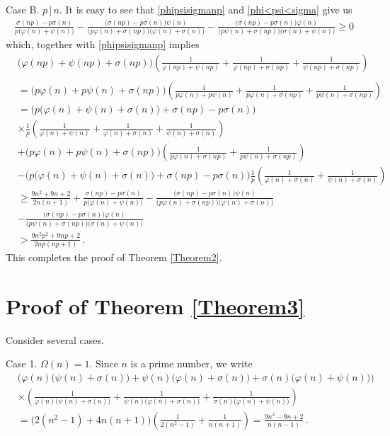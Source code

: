 \documentclass[12pt]{article}
\begin{document}
Case B.  \;  $p\,|\,n$. It is easy to see that \eqref{phipsisigmanp} and \eqref{phi<psi<sigma} give us
\begin{align*}
\frac{\sigma(np)-p\sigma(n)}{p\big(\varphi(n)+\psi(n)\big)}-\frac{\big(\sigma(np)-p\sigma(n))\psi(n)}{\big(p\varphi(n)+\sigma(np)\big)\big(\varphi(n)+\sigma(n)\big)}
-\frac{\big(\sigma(np)-p\sigma(n))\varphi(n)}{\big(p\psi(n)+\sigma(np)\big)\big(\sigma(n)+\psi(n)\big)}\geq0
\end{align*}
which, together with \eqref{phipsisigmanp} implies
\begin{align*}
&\big(\varphi(np)+\psi(np)+\sigma(np)\big)\left(\frac{1}{\varphi(np)+\psi(np)}+\frac{1}{\varphi(np)+\sigma(np)}+\frac{1}{\psi(np)+\sigma(np)}\right)\\
\end{align*}
\begin{align*}
&=\big(p\varphi(n)+p\psi(n)+\sigma(np)\big)\left(\frac{1}{p\varphi(n)+p\psi(n)}+\frac{1}{p\varphi(n)+\sigma(np)}+\frac{1}{p\psi(n)+\sigma(np)}\right)\\
&=\Big(p\big(\varphi(n)+\psi(n)+\sigma(n)\big)+\sigma(np)-p\sigma(n)\Big)\\
&\times\frac{1}{p}\left(\frac{1}{\varphi(n)+\psi(n)}+\frac{1}{\varphi(n)+\sigma(n)}+\frac{1}{\psi(n)+\sigma(n)}\right)\\
&+\big(p\varphi(n)+p\psi(n)+\sigma(np)\big)\left(\frac{1}{p\varphi(n)+\sigma(np)}+\frac{1}{p\psi(n)+\sigma(np)}\right)\\
&-\Big(p\big(\varphi(n)+\psi(n)+\sigma(n)\big)+\sigma(np)-p\sigma(n)\Big)\frac{1}{p}\left(\frac{1}{\varphi(n)+\sigma(n)}+\frac{1}{\psi(n)+\sigma(n)}\right)\\
&\geq\frac{9n^2+9n+2}{2n(n+1)}+\frac{\sigma(np)-p\sigma(n)}{p\big(\varphi(n)+\psi(n)\big)}-\frac{\big(\sigma(np)-p\sigma(n))\psi(n)}{\big(p\varphi(n)+\sigma(np)\big)\big(\varphi(n)+\sigma(n)\big)}\\
&-\frac{\big(\sigma(np)-p\sigma(n))\varphi(n)}{\big(p\psi(n)+\sigma(np)\big)\big(\sigma(n)+\psi(n)\big)}\\
&>\frac{9n^2p^2+9np+2}{2np(np+1)}\,.
\end{align*}
This completes the proof of Theorem \ref{Theorem2}.


\section{Proof of Theorem \ref{Theorem3}}

Consider several cases.

Case 1. \; $\Omega(n)=1$. Since $n$ is a prime number, we write
\begin{align*}
&\Big(\varphi(n)\big(\psi(n)+\sigma(n)\big)+\psi(n)\big(\varphi(n)+\sigma(n)\big)+\sigma(n)\big(\varphi(n)+\psi(n)\big)\Big)\\
&\times\left(\frac{1}{\varphi(n)\big(\psi(n)+\sigma(n)\big)}+\frac{1}{\psi(n)\big(\varphi(n)+\sigma(n)\big)}+\frac{1}{\sigma(n)\big(\varphi(n)+\psi(n)\big)}\right)\\
&=\big(2(n^2-1)+4n(n+1)\big)\left(\frac{1}{2(n^2-1)}+\frac{1}{n(n+1)}\right)=\frac{9n^2-9n+2}{n(n-1)}\,.
\end{align*}
\end{document}
